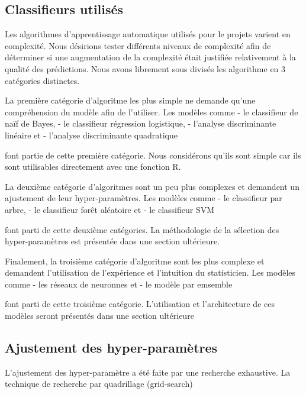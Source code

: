 \subsection{Classifieurs utilisés}

Les algorithmes d'apprentissage automatique utilisés pour le projets varient en complexité. Nous désirions tester différents niveaux de complexité afin de déterminer si une augmentation de la complexité était justifiée relativement à la qualité des prédictions. Nous avons librement sous divisés les algorithme en 3 catégories distinctes. 

La première catégorie d'algoritme les plus simple ne demande qu'une compréhension du modèle afin de l'utiliser. Les modèles comme 
- le classifieur de naïf de Bayes, 
- le classifieur régression logistique, 
- l'analyse discriminante linéaire et 
- l'analyse discriminante quadratique 

font partie de cette première catégorie. Nous considérons qu'ils sont simple car ils sont utilisables directement avec une fonction R. 

La deuxième catégorie d'algoritmes sont un peu plus complexes et demandent un ajustement de leur hyper-paramètres. Les modèles comme 
- le classifieur par arbre, 
- le classifieur forêt aléatoire et 
- le classifieur SVM 

font parti de cette deuxième catégories. La méthodologie de la sélection des hyper-paramètres est présentée dans une section ultérieure.

Finalement, la troisième catégorie d'algoritme sont les plus complexe et demandent l'utilisation de l'expérience et l'intuition du statisticien. Les modèles comme 
- les réseaux de neuronnes et 
- le modèle par emsemble 

font parti de cette troisième catégorie. L'utilisation et l'architecture de ces modèles seront présentés dans une section ultérieure

\subsection{Ajustement des hyper-paramètres}

L'ajustement des hyper-paramètre a été faite par une recherche exhaustive. La technique de recherche par quadrillage (grid-search) 


\subsection{}

